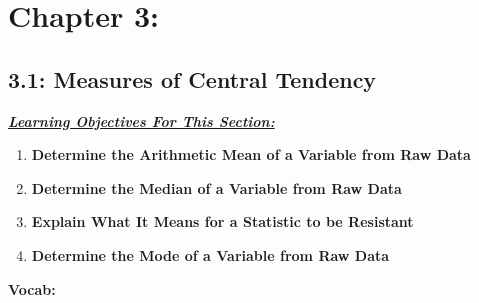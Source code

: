 \documentclass{report}
\begin{document}
        \pagebreak \bigbreak \noindent
        \section{Chapter 3:}
        \bigbreak \noindent 
        \subsection{3.1: Measures of Central Tendency}
        \bigbreak \noindent 
        \textbf{\textit{\underline{Learning Objectives For This Section:}}}
        \begin{enumerate}
            \item \textbf{Determine the Arithmetic Mean of a Variable from Raw Data}
            \item \textbf{Determine the Median of a Variable from Raw Data}
            \item \textbf{Explain What It Means for a Statistic to be Resistant}
            \item \textbf{Determine the Mode of a Variable from Raw Data}
        \end{enumerate}
        \bigbreak \noindent 
        \textbf{Vocab:}
\end{document}
